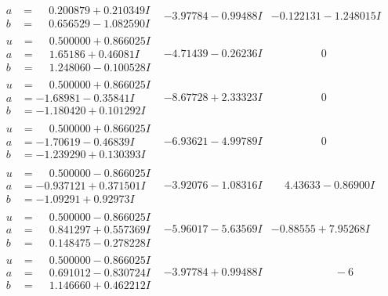 \documentclass[1p]{elsarticle_modified}
\theoremstyle{definition}
\begin{document}
$$\begin{array}{c|c|c}
\begin{aligned}
a &= \phantom{-}0.200879 + 0.210349 I \\
b &= \phantom{-}0.656529 - 1.082590 I\end{aligned}
 & -3.97784 - 0.99488 I & -0.122131 - 1.248015 I \\ \hline\begin{aligned}
u &= \phantom{-}0.500000 + 0.866025 I \\
a &= \phantom{-}1.65186 + 0.46081 I \\
b &= \phantom{-}1.248060 - 0.100528 I\end{aligned}
 & -4.71439 - 0.26236 I & \phantom{-0.000000 } 0 \\ \hline\begin{aligned}
u &= \phantom{-}0.500000 + 0.866025 I \\
a &= -1.68981 - 0.35841 I \\
b &= -1.180420 + 0.101292 I\end{aligned}
 & -8.67728 + 2.33323 I & \phantom{-0.000000 } 0 \\ \hline\begin{aligned}
u &= \phantom{-}0.500000 + 0.866025 I \\
a &= -1.70619 - 0.46839 I \\
b &= -1.239290 + 0.130393 I\end{aligned}
 & -6.93621 - 4.99789 I & \phantom{-0.000000 } 0 \\ \hline\begin{aligned}
u &= \phantom{-}0.500000 - 0.866025 I \\
a &= -0.937121 + 0.371501 I \\
b &= -1.09291 + 0.92973 I\end{aligned}
 & -3.92076 - 1.08316 I & \phantom{-}4.43633 - 0.86900 I \\ \hline\begin{aligned}
u &= \phantom{-}0.500000 - 0.866025 I \\
a &= \phantom{-}0.841297 + 0.557369 I \\
b &= \phantom{-}0.148475 - 0.278228 I\end{aligned}
 & -5.96017 - 5.63569 I & -0.88555 + 7.95268 I \\ \hline\begin{aligned}
u &= \phantom{-}0.500000 - 0.866025 I \\
a &= \phantom{-}0.691012 - 0.830724 I \\
b &= \phantom{-}1.146660 + 0.462212 I\end{aligned}
 & -3.97784 + 0.99488 I & \phantom{-0.000000 -}     -6

\end{array}$$
\end{document}
